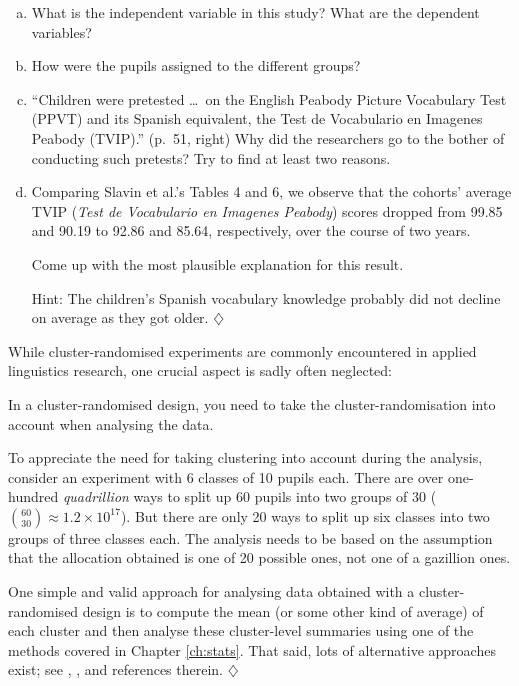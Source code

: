 \documentclass[a4paper]{tufte-book}\usepackage[]{graphicx}\usepackage[]{xcolor}
\newcommand*{\parend}[1][$\diamondsuit$]{%
  \unskip\nobreak\hspace{1em plus 1fill}$\diamondsuit$%
}
\begin{document}
\begin{enumerate}[(a)]
  \item What is the independent variable in this study?
        What are the dependent variables?

  \item How were the pupils assigned to the different groups?
  
  \item ``Children were pretested \dots\ on the English Peabody
  Picture Vocabulary Test (PPVT) and its Spanish equivalent, the Test de
  Vocabulario en Imagenes Peabody (TVIP).'' (p.~51, right)
  Why did the researchers go to the bother of conducting such pretests?
  Try to find at least two reasons.

  \item  Comparing Slavin et al.'s Tables 4 and 6,
  we observe that the cohorts' average TVIP
  ({\it Test de Vocabulario en Imagenes Peabody}) scores dropped
  from 99.85 and 90.19 to 92.86 and 85.64, respectively,
  over the course of two years.

  Come up with the most
  plausible explanation for this result.
  
  Hint: The children's Spanish vocabulary knowledge probably did not
  decline on average as they got older.\parend
\end{enumerate}

While cluster-randomised experiments are commonly encountered in 
applied linguistics research, one crucial aspect is sadly often neglected:

\begin{framed}
 In a cluster-randomised design, you need to
 take the cluster-randomisation into account when analysing the data.
\end{framed}

To appreciate the need for taking clustering into account during the analysis, 
consider an experiment with 6 classes of 10 pupils each. 
There are over one-hundred \emph{quadrillion} ways to split up 60 pupils into 
two groups of 30 (${60 \choose 30} \approx 1.2 \times 10^{17}$). 
But there are only 20 ways to split up six classes into two groups of three classes each. 
The analysis needs to be based on the assumption that the allocation obtained 
is one of 20 possible ones, not one of a gazillion ones.

\label{remark:clusteranalysis}
  One simple and valid approach for analysing data obtained with 
  a cluster-randomised design is to compute the mean (or some other kind of average) 
  of each cluster and then analyse these cluster-level summaries using one of the
  methods covered in Chapter \ref{ch:stats}.
  That said, lots of alternative approaches exist; 
  see \citet{Vanhove2015}, \citet{Vanhove2020c}, and references therein.
\parend
\end{document}
